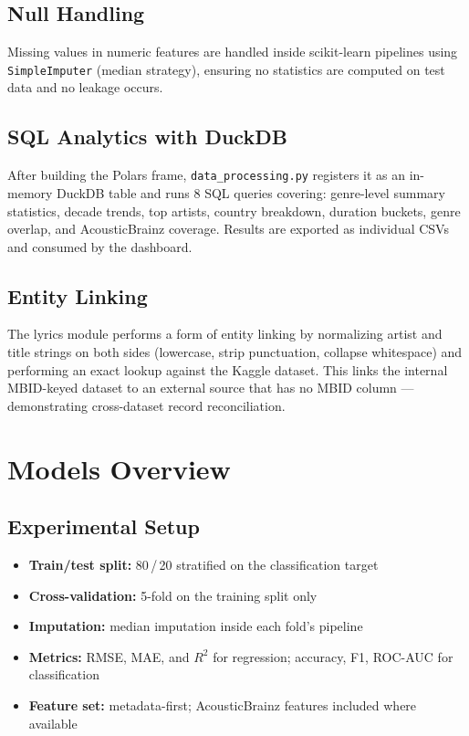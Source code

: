 \documentclass[11pt, letterpaper]{article}
\begin{document}
\subsection{Null Handling}

Missing values in numeric features are handled inside scikit-learn pipelines
using \texttt{SimpleImputer} (median strategy), ensuring no statistics are
computed on test data and no leakage occurs.

\subsection{SQL Analytics with DuckDB}

After building the Polars frame, \texttt{data\_processing.py} registers it
as an in-memory DuckDB table and runs 8 SQL queries covering:
genre-level summary statistics, decade trends, top artists, country breakdown,
duration buckets, genre overlap, and AcousticBrainz coverage. Results are
exported as individual CSVs and consumed by the dashboard.

\subsection{Entity Linking}

The lyrics module performs a form of entity linking by normalizing
artist and title strings on both sides (lowercase, strip punctuation,
collapse whitespace) and performing an exact lookup against the Kaggle dataset.
This links the internal MBID-keyed dataset to an external source that has no
MBID column — demonstrating cross-dataset record reconciliation.

\section{Models Overview}

\subsection{Experimental Setup}

\begin{itemize}[noitemsep]
    \item \textbf{Train/test split:} 80\,/\,20 stratified on the classification target
    \item \textbf{Cross-validation:} 5-fold on the training split only
    \item \textbf{Imputation:} median imputation inside each fold's pipeline
    \item \textbf{Metrics:} RMSE, MAE, and $R^2$ for regression; accuracy, F1, ROC-AUC for classification
    \item \textbf{Feature set:} metadata-first; AcousticBrainz features included where available
\end{itemize}
\end{document}
